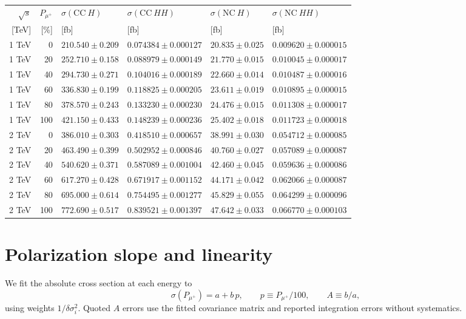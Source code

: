\documentclass[10pt,a4paper]{article}
\newcommand{\pol}{P_{\mu^+}}
\newcommand{\sqrts}{\sqrt{s}}
\begin{document}
\begin{center}
\setlength{\tabcolsep}{5pt}
\renewcommand{\arraystretch}{1.17}
\begin{tabular}{rrllll}\toprule
$\sqrts$ & $\pol$ & $\sigma(\mathrm{CC}\ H)$ & $\sigma(\mathrm{CC}\ HH)$ & $\sigma(\mathrm{NC}\ H)$ & $\sigma(\mathrm{NC}\ HH)$\\
\mbox{[TeV]} &\mbox{[\%]} & [fb] & [fb] & [fb] & [fb]\\\midrule
1 TeV & 0 & $210.540\pm0.209$ & $0.074384\pm0.000127$ & $20.835\pm0.025$ & $0.009620\pm0.000015$ \\
1 TeV & 20 & $252.710\pm0.158$ & $0.088979\pm0.000149$ & $21.770\pm0.015$ & $0.010045\pm0.000017$ \\
1 TeV & 40 & $294.730\pm0.271$ & $0.104016\pm0.000189$ & $22.660\pm0.014$ & $0.010487\pm0.000016$ \\
1 TeV & 60 & $336.830\pm0.199$ & $0.118825\pm0.000205$ & $23.611\pm0.019$ & $0.010895\pm0.000015$ \\
1 TeV & 80 & $378.570\pm0.243$ & $0.133230\pm0.000230$ & $24.476\pm0.015$ & $0.011308\pm0.000017$ \\
1 TeV & 100 & $421.150\pm0.433$ & $0.148239\pm0.000236$ & $25.402\pm0.018$ & $0.011723\pm0.000018$ \\
2 TeV & 0 & $386.010\pm0.303$ & $0.418510\pm0.000657$ & $38.991\pm0.030$ & $0.054712\pm0.000085$ \\
2 TeV & 20 & $463.490\pm0.399$ & $0.502952\pm0.000846$ & $40.760\pm0.027$ & $0.057089\pm0.000087$ \\
2 TeV & 40 & $540.620\pm0.371$ & $0.587089\pm0.001004$ & $42.460\pm0.045$ & $0.059636\pm0.000086$ \\
2 TeV & 60 & $617.270\pm0.428$ & $0.671917\pm0.001152$ & $44.171\pm0.042$ & $0.062066\pm0.000087$ \\
2 TeV & 80 & $695.000\pm0.614$ & $0.754495\pm0.001277$ & $45.829\pm0.055$ & $0.064299\pm0.000096$ \\
2 TeV & 100 & $772.690\pm0.517$ & $0.839521\pm0.001397$ & $47.642\pm0.033$ & $0.066770\pm0.000103$ \\
\bottomrule\end{tabular}
\end{center}



\section*{Polarization slope and linearity}
We fit the absolute cross section at each energy to
\[
\sigma(\pol)=a+b\,p,\qquad p\equiv\pol/100,\qquad A\equiv b/a,
\]
using weights $1/\delta\sigma_i^2$. Quoted $A$ errors use the fitted covariance matrix and reported integration errors without systematics.
\end{document}
